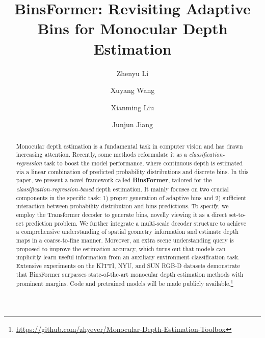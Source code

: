 \documentclass[runningheads]{llncs}
\begin{document}
\pagestyle{headings}
\mainmatter
\def\ECCVSubNumber{1928}  

\title{BinsFormer: Revisiting Adaptive Bins for Monocular Depth Estimation} 

\begin{comment}
\titlerunning{ECCV-22 submission ID \ECCVSubNumber} 
\authorrunning{ECCV-22 submission ID \ECCVSubNumber} 
\author{Anonymous ECCV submission}
\institute{Paper ID \ECCVSubNumber} 
\end{comment}


\author{Zhenyu Li \and
Xuyang Wang \and
Xianming Liu \and
Junjun Jiang\textsuperscript{\Letter}}

\maketitle 

\begin{abstract}


Monocular depth estimation is a fundamental task in computer vision and has drawn increasing attention. Recently, some methods reformulate it as a \textit{classification-regression} task to boost the model performance, where continuous depth is estimated via a linear combination of predicted probability distributions and discrete bins. In this paper, we present a novel framework called \textbf{BinsFormer}, tailored for the \textit{classification-regression-based} depth estimation. It mainly focuses on two crucial components in the specific task: 1) proper generation of adaptive bins and 2) sufficient interaction between probability distribution and bins predictions. To specify, we employ the Transformer decoder to generate bins, novelly viewing it as a direct set-to-set prediction problem. We further integrate a multi-scale decoder structure to achieve a comprehensive understanding of spatial geometry information and estimate depth maps in a coarse-to-fine manner. Moreover, an extra scene understanding query is proposed to improve the estimation accuracy, which turns out that models can implicitly learn useful information from an auxiliary environment classification task. Extensive experiments on the KITTI, NYU, and SUN RGB-D datasets demonstrate that BinsFormer surpasses state-of-the-art monocular depth estimation methods with prominent margins. Code and pretrained models will be made publicly available.\footnote{\url{https://github.com/zhyever/Monocular-Depth-Estimation-Toolbox}}

\end{abstract}
\end{document}
